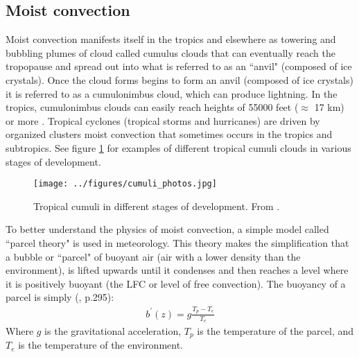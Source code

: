 \documentclass[letterpaper,12pt,titlepage,oneside,final]{book}
\begin{document}
\subsection{Moist convection}\label{moist}

Moist convection manifests itself in the tropics and elsewhere as towering and bubbling plumes of cloud called cumulus clouds that can eventually reach the tropopause and spread out into what is referred to as an ``anvil" (composed of ice crystals). Once the cloud forms begins to form an anvil (composed of ice crystals) it is referred to as a cumulonimbus cloud, which can produce lightning. In the tropics, cumulonimbus clouds can easily reach heights of 55000 feet ($\approx$ 17 km) or more \citep{hollars_comparisons_2004}. Tropical cyclones (tropical storms and hurricanes) are driven by organized clusters moist convection that sometimes occurs in the tropics and subtropics. See figure \ref{fig:cumu} for examples of different tropical cumuli clouds in various stages of development.

\begin{figure}[H]
\centering
\noindent\texttt{[image: ../figures/cumuli\_photos.jpg]}\hfill
\caption{\footnotesize Tropical cumuli in different stages of development. From \cite{evans_introduction_2011}.}
\label{fig:cumu}
\end{figure}

To better understand the physics of moist convection, a simple model called ``parcel theory" is used in meteorology. This theory makes the simplification that a bubble or ``parcel" of buoyant air (air with a lower density than the environment), is lifted upwards until it condenses and then reaches a level where it is positively buoyant (the LFC or level of free convection). The buoyancy of a parcel is simply (\citep{holton_introduction_2004}, p.295):
\begin{align}
b^{'}(z)=g\frac{T_{p}-T_{e}}{T_{e}}
\end{align}
Where $g$ is the gravitational acceleration, $T_{p}$ is the temperature of the parcel, and $T_{e}$ is the temperature of the environment.
\end{document}
